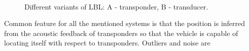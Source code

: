 \begin{figure}%
  \begin{center}
       \\
  \end{center}
  \caption{Different variants of LBL: A - transponder, B - transducer.}
  \vspace{-10pt}
  \label{fig:lbl}
\end{figure}
Common feature for all the mentioned systems is that the position is inferred from the acoustic feedback of transponders so that the vehicle is capable of locating itself with respect to transponders. Outliers and noise are 

